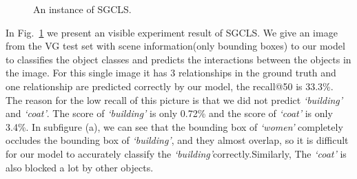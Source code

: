 \begin{figure}
{\begin{minipage}[t]{4.5cm}
	\end{minipage}}
	\caption[An instance of SGCLS]{An instance of SGCLS.}
	\label{fig:sgcls}
\end{figure}
In Fig.~\ref{fig:sgcls}  we present an visible experiment result of SGCLS. We give an image from the VG test set with scene information(only bounding boxes) to our  model to classifies the object classes and predicts the interactions between the objects in the image. For this single image it has 3 relationships in the ground truth and one relationship are predicted correctly by our model, the recall@50 is 33.3\%. The reason for the low recall of this picture is that we did not predict \textit{`building'} and \textit{`coat'}. The score of \textit{`building'} is only 0.72\% and the score of \textit{`coat'} is only 3.4\%. In subfigure (a), we can see that the bounding box of \textit{`women'} completely occludes the bounding box of \textit{`building'}, and they almost overlap, so it is difficult for our model to accurately classify the \textit{`building'}correctly.Similarly,
The \textit{`coat'} is also blocked a lot by other objects.
 
